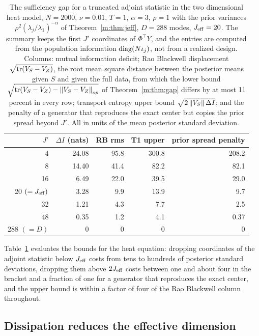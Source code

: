\begin{table}[tp]\centering\small
\caption{The sufficiency gap for a truncated adjoint statistic in the two dimensional heat model, $N=2000$, $\nu=0.01$, $T=1$, $\alpha=3$, $\rho=1$ with the prior variances $\rho^2(\lambda_j/\lambda_1)^{-\alpha}$ of Theorem~\ref{m:thm:jeff}, $D=288$ modes, $J_{\rm eff}=20$. The summary keeps the first $J'$ coordinates of $\Phi^\top Y$, and the entries are computed from the population information $\operatorname{diag}(N\iota_j)$, not from a realized design. Columns: mutual information deficit; Rao Blackwell displacement $\sqrt{\mathrm{tr}(V_S-V_Z)}$, the root mean square distance between the posterior means given $S$ and given the full data, from which the lower bound $\sqrt{\mathrm{tr}(V_S-V_Z)-\left\|V_S-V_Z\right\|_{op}}$ of Theorem~\ref{m:thm:gap} differs by at most 11 percent in every row; transport entropy upper bound $\sqrt{2\left\|V_S\right\|\Delta I}$; and the penalty of a generator that reproduces the exact center but copies the prior spread beyond $J'$. All in units of the mean posterior standard deviation.}\label{m:tab:gap}
\begin{tabular}{rrrrr}
\toprule
$J'$ & $\Delta I$ (nats) & RB rms & T1 upper & prior spread penalty\\
\midrule
4 & 24.08 & 95.8 & 300.8 & 208.2\\
8 & 14.40 & 41.4 & 82.2 & 82.1\\
16 & 6.49 & 22.0 & 39.5 & 29.0\\
20 $(=J_{\rm eff})$ & 3.28 & 9.9 & 13.9 & 9.7\\
32 & 1.21 & 4.3 & 7.7 & 2.5\\
48 & 0.35 & 1.2 & 4.1 & 0.37\\
288 $(=D)$ & 0 & 0 & 0 & 0\\
\bottomrule
\end{tabular}
\end{table}

Table~\ref{m:tab:gap} evaluates the bounds for the heat equation: dropping coordinates of the adjoint statistic below $J_{\rm eff}$ costs from tens to hundreds of posterior standard deviations, dropping them above $2J_{\rm eff}$ costs between one and about four in the bracket and a fraction of one for a generator that reproduces the exact center, and the upper bound is within a factor of four of the Rao Blackwell column throughout.

\subsection{Dissipation reduces the effective dimension}

